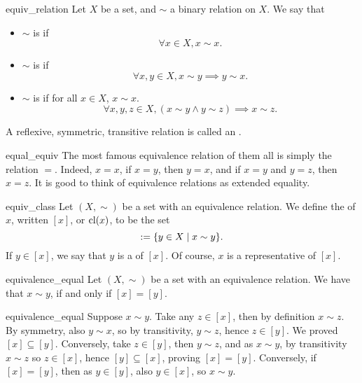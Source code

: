 \begin{cdef}{}{equiv_relation}
    Let \( X \) be a set, and \( \sim \) a binary relation on \( X \). We say that
    \begin{itemize}
        \item \( \sim \) is  if 
        \begin{equation*}
            \forall x \in X, x \sim x.
        \end{equation*}
        \item \( \sim \) is  if
        \begin{equation*}
            \forall x, y \in X, x \sim y \implies y \sim x.
        \end{equation*}
        \item \( \sim \) is  if for all \( x \in X \), \( x \sim x \).
        \begin{equation*}
            \forall x, y, z \in X, (x \sim y \land y \sim z) \implies x \sim z.
        \end{equation*}
    \end{itemize}
    A reflexive, symmetric, transitive relation is called an . 
\end{cdef}

\begin{cexp}{}{equal_equiv}
    The most famous equivalence relation of them all is simply the relation \( = \). Indeed, \( x = x \), if \( x = y \), then \( y = x \), and if \( x = y \) and \( y = z \), then \( x = z \). It is good to think of equivalence relations as extended equality.    
\end{cexp}

\begin{cdef}{}{equiv_class}
    Let \( (X, \sim) \) be a set with an equivalence relation. We define the  of \( x \), written \( [x] \), or \( \operatorname{cl}(x) \), to be the set
    \begin{equation*}
        [x] \defeq \{ y \in X \mid x \sim y \}.
    \end{equation*}
    If \( y \in [x] \), we say that \( y \) is a  of \( [x] \). Of course, \( x \) is a representative of \( [x] \).
\end{cdef}

\begin{clem}{}{equivalence_equal}
    Let \( (X, \sim) \) be a set with an equivalence relation. We have that \( x \sim y \), if and only if \( [x] = [y] \).
\end{clem}
\begin{lemproof}{equivalence_equal}
    Suppose \( x \sim y \). Take any \( z \in [x] \), then by definition \( x \sim z \). By symmetry, also \( y \sim x \), so by transitivity, \( y \sim z \), hence \( z \in [y] \). We proved \( [x] \subseteq [y] \). Conversely, take \( z \in [y] \), then \( y \sim z \), and as \( x \sim y \), by transitivity \( x \sim z \) so \( z \in [x] \), hence \( [y] \subseteq [x] \), proving \( [x] = [y] \). Conversely, if \( [x] = [y] \), then as \( y \in [y] \), also \( y \in [x] \), so \( x \sim y \). 
\end{lemproof}

